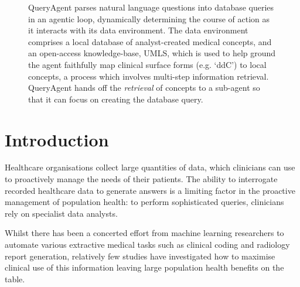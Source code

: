 \documentclass[11pt]{article}
\begin{document}
\begin{figure}[htbp]
\centering

\caption{
QueryAgent parses natural language questions into database queries in an agentic loop, dynamically determining the course of action as it interacts with its data environment.
The data environment comprises a local database of analyst-created medical concepts, and an open-access knowledge-base, UMLS, which is used to help ground the agent faithfully map clinical surface forms (e.g. `ddC') to local concepts, a process which involves multi-step information retrieval.
QueryAgent hands off the \textit{retrieval} of concepts to a sub-agent so that it can focus on creating the database query.}
\label{fig:question-to-query}

\end{figure}

\section{Introduction}

Healthcare organisations collect large quantities of data, which clinicians can use to proactively manage the needs of their patients.
The ability to interrogate recorded healthcare data to generate answers is a limiting factor in the proactive management of population health: to perform sophisticated queries, clinicians rely on specialist data analysts.

Whilst there has been a concerted effort from machine learning researchers to automate various extractive medical tasks such as clinical coding and radiology report generation, relatively few studies have investigated how to maximise clinical use of this information leaving large population health benefits on the table.


\end{document}
